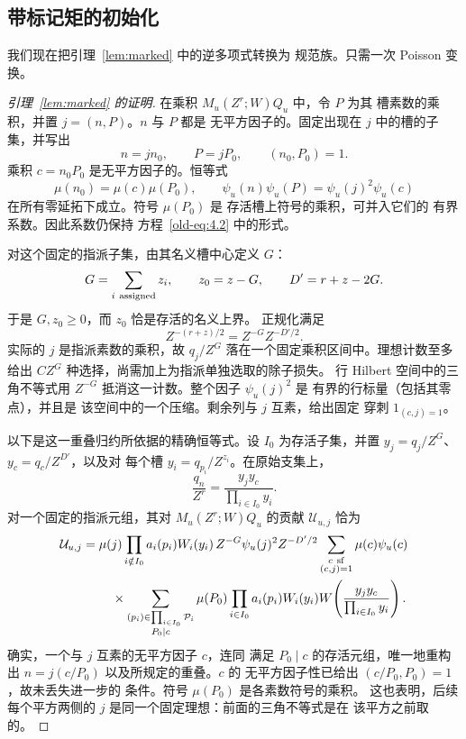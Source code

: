 \documentclass[11pt,a4paper]{article}
\numberwithin{equation}{section}
\numberwithin{figure}{section}
\theoremstyle{definition}
\theoremstyle{remark}
\begin{document}
\subsection{带标记矩的初始化}

我们现在把引理~\ref{lem:marked} 中的逆多项式转换为
规范族。只需一次 Poisson 变换。

\begin{proof}[引理~\ref{lem:marked} 的证明]
在乘积 \(M_u(Z^r;W)Q_u\) 中，令 \(P\) 为其
槽素数的乘积，并置 \(j=(n,P)\)。\(n\) 与 \(P\) 都是
无平方因子的。固定出现在 \(j\) 中的槽的子集，并写出
\[
 n=jn_0,\qquad P=jP_0,\qquad (n_0,P_0)=1.
\]
乘积 \(c=n_0P_0\) 是无平方因子的。恒等式
\[
 \mu(n_0)=\mu(c)\mu(P_0),\qquad
 \psi_u(n)\psi_u(P)=\psi_u(j)^2\psi_u(c)
\]
在所有零延拓下成立。符号 \(\mu(P_0)\) 是
存活槽上符号的乘积，可并入它们的
有界系数。因此系数仍保持
方程~\eqref{old-eq:4.2} 中的形式。

对这个固定的指派子集，由其名义槽中心定义 \(G\)：
\[
 G=\sum_{i\ {\rm assigned}}z_i,\qquad
 z_0=z-G,\qquad D'=r+z-2G.
\]
于是 \(G,z_0\ge0\)，而 \(z_0\) 恰是存活的名义上界。
正规化满足
\[
 Z^{-(r+z)/2}=Z^{-G}Z^{-D'/2}.
\]
实际的 \(j\) 是指派素数的乘积，故
\(q_j/Z^G\) 落在一个固定乘积区间中。理想计数至多给出
\(CZ^G\) 种选择，尚需加上为指派单独选取的除子损失。
行 Hilbert 空间中的三角不等式用
\(Z^{-G}\) 抵消这一计数。整个因子 \(\psi_u(j)^2\) 是
有界的行标量（包括其零点），并且是
该空间中的一个压缩。剩余列与 \(j\) 互素，给出固定
穿刺 \(1_{(c,j)=1}\)。

以下是这一重叠归约所依据的精确恒等式。设
\(I_0\) 为存活子集，并置
\(y_j=q_j/Z^G\)、\(y_c=q_c/Z^{D'}\)，以及对
每个槽 \(y_i=q_{p_i}/Z^{z_i}\)。在原始支集上，
\[
 \frac{q_n}{Z^r}=\frac{y_jy_c}{\prod_{i\in I_0}y_i}.
\]
对一个固定的指派元组，其对
\(M_u(Z^r;W)Q_u\) 的贡献 \(\mathcal U_{u,j}\) 恰为
\begin{equation}\label{eq:initial-overlap-polynomial}
 \begin{split}
 \mathcal U_{u,j}={}&\mu(j)
 \prod_{i\notin I_0}a_i(p_i)W_i(y_i)\,
 Z^{-G}\psi_u(j)^2 Z^{-D'/2}
 \sum_{\substack{c\ {\rm sf}\\(c,j)=1}}\mu(c)\psi_u(c)\\
 &\quad\times
 \sum_{\substack{(p_i)\in\prod_{i\in I_0}\mathcal P_i\\P_0\mid c}}
 \mu(P_0)\prod_{i\in I_0}a_i(p_i)W_i(y_i)
 W\!\left(\frac{y_jy_c}{\prod_{i\in I_0}y_i}\right).
 \end{split}
\end{equation}
确实，一个与 \(j\) 互素的无平方因子 \(c\)，连同
满足 \(P_0\mid c\) 的存活元组，唯一地重构出
\(n=j(c/P_0)\) 以及所规定的重叠。\(c\) 的
无平方因子性已给出 \((c/P_0,P_0)=1\)，故未丢失进一步的
条件。符号 \(\mu(P_0)\) 是各素数符号的乘积。
这也表明，后续每个平方两侧的 \(j\)
是同一个固定理想：前面的三角不等式是在
该平方之前取的。


\end{proof}
\end{document}
